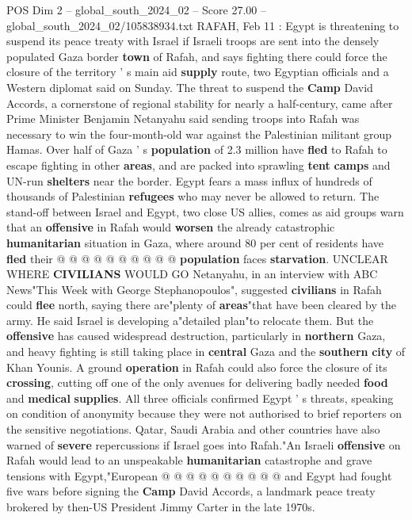 \begin{textsample}{POS Dim 2 – global\_south\_2024\_02 – Score 27.00 – global\_south\_2024\_02/105838934.txt}  \label{ex:f2_pos_035}
RAFAH, Feb 11 : Egypt is threatening to suspend its peace treaty with Israel if Israeli troops are sent into the densely populated Gaza border \textbf{town} of Rafah, and says fighting there could force the closure of the territory ' s main aid \textbf{supply} route, two Egyptian officials and a Western diplomat said on Sunday.
The threat to suspend the \textbf{Camp} David Accords, a cornerstone of regional stability for nearly a half-century, came after Prime Minister Benjamin Netanyahu said sending troops into Rafah was necessary to win the four-month-old war against the Palestinian militant group Hamas.
Over half of Gaza ' s \textbf{population} of 2.3 million have \textbf{fled} to Rafah to escape fighting in other \textbf{areas}, and are packed into sprawling \textbf{tent} \textbf{camps} and UN-run \textbf{shelters} near the border.
Egypt fears a mass influx of hundreds of thousands of Palestinian \textbf{refugees} who may never be allowed to return.
The stand-off between Israel and Egypt, two close US allies, comes as aid groups warn that an \textbf{offensive} in Rafah would \textbf{worsen} the already catastrophic \textbf{humanitarian} situation in Gaza, where around 80 per cent of residents have \textbf{fled} their @ @ @ @ @ @ @ @ @ @ \textbf{population} faces \textbf{starvation}.
UNCLEAR WHERE \textbf{CIVILIANS} WOULD GO Netanyahu, in an interview with ABC News"This Week with George Stephanopoulos", suggested \textbf{civilians} in Rafah could \textbf{flee} north, saying there are"plenty of \textbf{areas}"that have been cleared by the army.
He said Israel is developing a"detailed plan"to relocate them.
But the \textbf{offensive} has caused widespread destruction, particularly in \textbf{northern} Gaza, and heavy fighting is still taking place in \textbf{central} Gaza and the \textbf{southern} \textbf{city} of Khan Younis.
A ground \textbf{operation} in Rafah could also force the closure of its \textbf{crossing}, cutting off one of the only avenues for delivering badly needed \textbf{food} and \textbf{medical} \textbf{supplies}.
All three officials confirmed Egypt ' s threats, speaking on condition of anonymity because they were not authorised to brief reporters on the sensitive negotiations.
Qatar, Saudi Arabia and other countries have also warned of \textbf{severe} repercussions if Israel goes into Rafah."An Israeli \textbf{offensive} on Rafah would lead to an unspeakable \textbf{humanitarian} catastrophe and grave tensions with Egypt,"European @ @ @ @ @ @ @ @ @ @ and Egypt had fought five wars before signing the \textbf{Camp} David Accords, a landmark peace treaty brokered by then-US President Jimmy Carter in the late 1970s.

\end{textsample}
